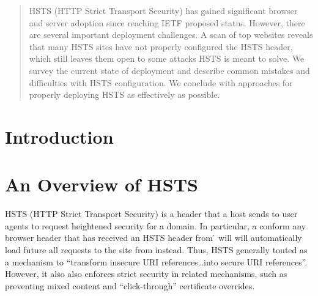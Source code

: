 \documentclass{acm_proc_article-sp}
\begin{document}
\date{October 08, 2013}

\maketitle
\begin{abstract}
HSTS (HTTP Strict Transport Security) has gained significant browser and server adoption since reaching IETF proposed status. However, there are several important deployment challenges. A scan of top websites reveals that many HSTS sites have not properly configured the HSTS header, which still leaves them open to some attacks HSTS is meant to solve. We survey the current state of deployment and describe common mistakes and difficulties with HSTS configuration. We conclude with approaches for properly deploying HSTS as effectively as possible.\end{abstract}





\section{Introduction}
\label{sec:intro}

\cite{coderrr-blog}

\section{An Overview of HSTS}

HSTS (HTTP Strict Transport Security) is a header that a host sends to user agents to request heightened security for a domain. In particular, a conform any browser header that has received an HSTS header from {\h} will will automatically load future all requests to the site from {\s} instead. Thus, HSTS generally touted as a mechanism to ``transform insecure URI references\ldots into secure URI references''. However, it also also enforces strict security in related mechanisms, such as preventing mixed content and ``click-through'' certificate overrides\cite{rfc}.
\end{document}

